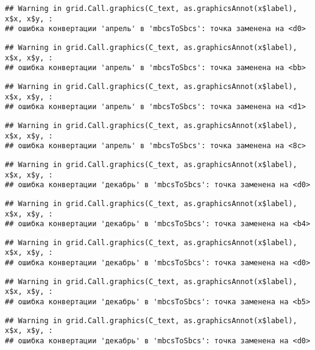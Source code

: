 \documentclass[
]{article}
\begin{document}
\begin{verbatim}
## Warning in grid.Call.graphics(C_text, as.graphicsAnnot(x$label), x$x, x$y, :
## ошибка конвертации 'апрель' в 'mbcsToSbcs': точка заменена на <d0>
\end{verbatim}

\begin{verbatim}
## Warning in grid.Call.graphics(C_text, as.graphicsAnnot(x$label), x$x, x$y, :
## ошибка конвертации 'апрель' в 'mbcsToSbcs': точка заменена на <bb>
\end{verbatim}

\begin{verbatim}
## Warning in grid.Call.graphics(C_text, as.graphicsAnnot(x$label), x$x, x$y, :
## ошибка конвертации 'апрель' в 'mbcsToSbcs': точка заменена на <d1>
\end{verbatim}

\begin{verbatim}
## Warning in grid.Call.graphics(C_text, as.graphicsAnnot(x$label), x$x, x$y, :
## ошибка конвертации 'апрель' в 'mbcsToSbcs': точка заменена на <8c>
\end{verbatim}

\begin{verbatim}
## Warning in grid.Call.graphics(C_text, as.graphicsAnnot(x$label), x$x, x$y, :
## ошибка конвертации 'декабрь' в 'mbcsToSbcs': точка заменена на <d0>
\end{verbatim}

\begin{verbatim}
## Warning in grid.Call.graphics(C_text, as.graphicsAnnot(x$label), x$x, x$y, :
## ошибка конвертации 'декабрь' в 'mbcsToSbcs': точка заменена на <b4>
\end{verbatim}

\begin{verbatim}
## Warning in grid.Call.graphics(C_text, as.graphicsAnnot(x$label), x$x, x$y, :
## ошибка конвертации 'декабрь' в 'mbcsToSbcs': точка заменена на <d0>
\end{verbatim}

\begin{verbatim}
## Warning in grid.Call.graphics(C_text, as.graphicsAnnot(x$label), x$x, x$y, :
## ошибка конвертации 'декабрь' в 'mbcsToSbcs': точка заменена на <b5>
\end{verbatim}

\begin{verbatim}
## Warning in grid.Call.graphics(C_text, as.graphicsAnnot(x$label), x$x, x$y, :
## ошибка конвертации 'декабрь' в 'mbcsToSbcs': точка заменена на <d0>
\end{verbatim}
\end{document}
